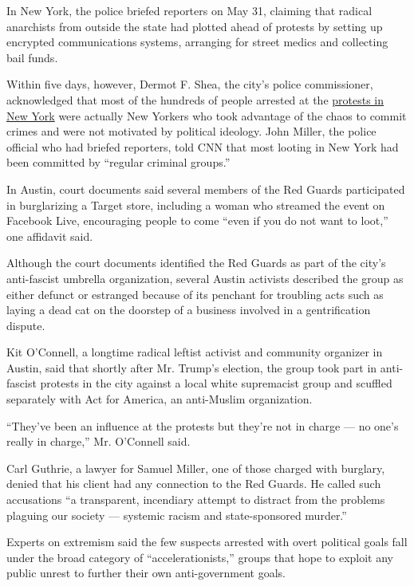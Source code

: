 In New York, the police briefed reporters on May 31, claiming that
radical anarchists from outside the state had plotted ahead of protests
by setting up encrypted communications systems, arranging for street
medics and collecting bail funds.

Within five days, however, Dermot F. Shea, the city's police
commissioner, acknowledged that most of the hundreds of people arrested
at the
\href{https://www.nytimes3xbfgragh.onion/2020/06/11/nyregion/nyc-george-floyd-protests.html}{protests
in New York} were actually New Yorkers who took advantage of the chaos
to commit crimes and were not motivated by political ideology. John
Miller, the police official who had briefed reporters, told CNN that
most looting in New York had been committed by ``regular criminal
groups.''

In Austin, court documents said several members of the Red Guards
participated in burglarizing a Target store, including a woman who
streamed the event on Facebook Live, encouraging people to come ``even
if you do not want to loot,'' one affidavit said.

Although the court documents identified the Red Guards as part of the
city's anti-fascist umbrella organization, several Austin activists
described the group as either defunct or estranged because of its
penchant for troubling acts such as laying a dead cat on the doorstep of
a business involved in a gentrification dispute.

Kit O'Connell, a longtime radical leftist activist and community
organizer in Austin, said that shortly after Mr. Trump's election, the
group took part in anti-fascist protests in the city against a local
white supremacist group and scuffled separately with Act for America, an
anti-Muslim organization.

``They've been an influence at the protests but they're not in charge
--- no one's really in charge,'' Mr. O'Connell said.

Carl Guthrie, a lawyer for Samuel Miller, one of those charged with
burglary, denied that his client had any connection to the Red Guards.
He called such accusations ``a transparent, incendiary attempt to
distract from the problems plaguing our society --- systemic racism and
state-sponsored murder.''

Experts on extremism said the few suspects arrested with overt political
goals fall under the broad category of ``accelerationists,'' groups that
hope to exploit any public unrest to further their own anti-government
goals.


